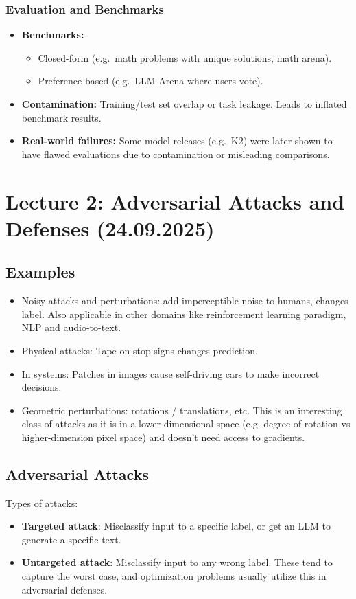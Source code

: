 \documentclass[11pt]{article}
\begin{document}
\subsubsection{Evaluation and Benchmarks}
\begin{itemize}
	\item \textbf{Benchmarks:}
	      \begin{itemize}
		      \item Closed-form (e.g.\ math problems with unique solutions, math arena).
		      \item Preference-based (e.g.\ LLM Arena where users vote).
	      \end{itemize}
	\item \textbf{Contamination:} Training/test set overlap or task leakage.  
	      Leads to inflated benchmark results.
	\item \textbf{Real-world failures:} Some model releases (e.g.\ K2) were later shown to have flawed evaluations due to contamination or misleading comparisons.
\end{itemize}
\newpage

\section{Lecture 2: Adversarial Attacks and Defenses (24.09.2025)} %
\subsection{Examples}
\begin{itemize}
	\item Noisy attacks and perturbations: add imperceptible noise to humans, changes label. Also applicable in other domains like reinforcement learning paradigm, NLP and audio-to-text.
	\item Physical attacks: Tape on stop signs changes prediction.
	\item In systems: Patches in images cause self-driving cars to make incorrect decisions.
	\item Geometric perturbations: rotations / translations, etc. This is an interesting class of attacks as it is in a lower-dimensional space (e.g. degree of rotation vs higher-dimension pixel space) and doesn't need access to gradients.
\end{itemize}

\subsection{Adversarial Attacks}
Types of attacks:
\begin{itemize}
	\item \textbf{Targeted attack}: Misclassify input to a specific label, or get an LLM to generate a specific text. 
	\item \textbf{Untargeted attack}: Misclassify input to any wrong label. These tend to capture the worst case, and optimization problems usually utilize this in adversarial defenses.
\end{itemize}
\end{document}
